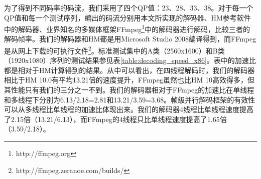 为了得到不同码率的码流，我们采用了四个QP值：23、28、33、38。对于每一个QP值和每一个测试序列，编出的码流分别用本文所实现的解码器、HM参考软件中的解码器、业界知名的多媒体框架FFmpeg\footnote{http://ffmpeg.org}中的解码器进行解码，比较三者的解码帧率。我们的解码器和HM都是用Microsoft Studio 2008编译得到，而FFmpeg是从网上下载的可执行文件\footnote{http://ffmpeg.zeranoe.com/builds/}。标准测试集中的A类（2560x1600）和B类（1920x1080）序列的测试结果参见表\ref{table:decoding_speed_x86}。表中的加速比都是相对于HM计算得到的结果。从中可以看出，在四线程解码时，我们的解码器相比于HM 10.0有平均13.21倍的速度提升，FFmpeg虽然也比HM 10高效得多，但其性能只有我们的三分之一不到。我们的解码器相对于FFmpeg的加速比在单线程和多线程下分别为6.13/2.18=2.81和13.21/3.59=3.68。帧级并行解码框架的有效性可以从多线程比单线程的加速比体现出来。我们的解码器4线程比单线程速度提高了2.15倍（13.21/6.13），而FFmpeg的4线程只比单线程速度提高了1.65倍（3.59/2.18）。

